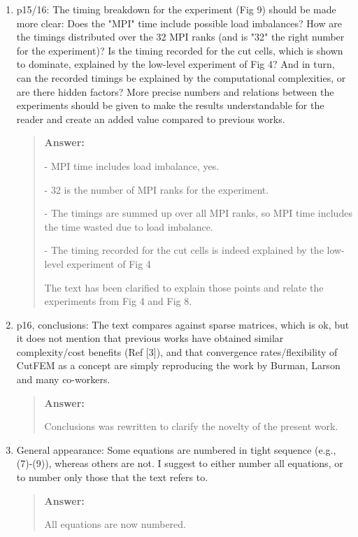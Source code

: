 \documentclass[11pt, a4paper]{article}
\newenvironment{answer}{%
      \begin{quote}%
            \color{blue!80!black}%
            \textbf{Answer:}%
            }{%
      \end{quote}%
}
\begin{document}
\begin{enumerate}[label=\textbullet, wide, labelindent=0pt]
      \item p15/16: The timing breakdown for the experiment (Fig 9) should be made more clear: Does the "MPI" time
            include possible load imbalances? How are the timings distributed over the 32 MPI ranks (and is "32" the
            right number
            for the experiment)? Is the timing recorded for the cut cells, which is shown to dominate, explained by the
            low-level
            experiment of Fig 4? And in turn, can the recorded timings be explained by the computational complexities,
            or
            are there
            hidden factors? More precise numbers and relations between the experiments should be given to make the
            results
            understandable for the reader and create an added value compared to previous works.
            \begin{answer}
                  - MPI time includes load imbalance, yes.

                  - 32 is the number of MPI ranks for the experiment.

                  - The timings are summed up over all MPI ranks, so MPI time includes the time wasted due to load
                  imbalance.

                  - The timing recorded for the cut cells is indeed explained by the low-level experiment of Fig 4

                  The text has been clarified to explain those points and relate the experiments from Fig 4 and Fig 8.
            \end{answer}

      \item p16, conclusions: The text compares against sparse matrices, which is ok, but it does not mention that
            previous works have obtained similar complexity/cost benefits (Ref [3]), and that convergence
            rates/flexibility of
            CutFEM as a concept are simply reproducing the work by Burman, Larson and many co-workers.
            \begin{answer}
                  Conclusions was rewritten to clarify the novelty of the present work.
            \end{answer}

      \item General appearance: Some equations are numbered in tight sequence (e.g., (7)-(9)), whereas others are
            not. I suggest to either number all equations, or to number only those that the text refers to.
            \begin{answer}
                  All equations are now numbered.
            \end{answer}
\end{enumerate}
\end{document}
